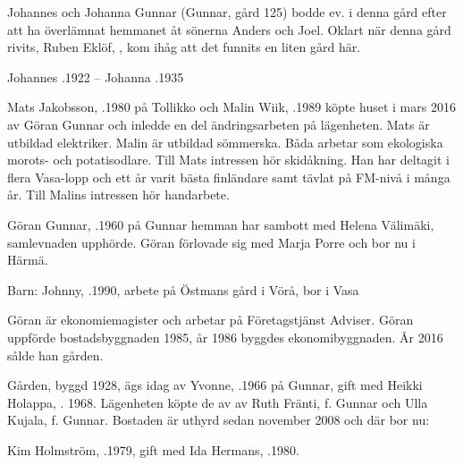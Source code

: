 
Johannes och Johanna Gunnar (Gunnar, gård 125) bodde ev. i denna gård efter att ha överlämnat hemmanet åt sönerna Anders och Joel. Oklart när denna gård rivits, Ruben Eklöf, , kom ihåg att det funnits en liten gård här.

Johannes .1922  --  Johanna .1935




Mats Jakobsson, .1980 på Tollikko och Malin Wiik, .1989 köpte huset i mars 2016 av Göran Gunnar och inledde en del ändringsarbeten på lägenheten. Mats är utbildad elektriker. Malin är utbildad sömmerska. Båda arbetar som ekologiska morots- och potatisodlare.
Till Mats intressen hör skidåkning. Han har deltagit i flera Vasa-lopp och ett år varit bästa finländare samt tävlat på FM-nivå i många år. Till Malins intressen hör handarbete.

Göran Gunnar, .1960 på Gunnar hemman har sambott med Helena Välimäki, samlevnaden upphörde. Göran förlovade sig med Marja Porre och bor nu i Härmä.

Barn: Johnny, .1990, arbete på Östmans gård i Vörå, bor i Vasa

Göran är ekonomiemagister och arbetar på Företagstjänst Adviser. Göran uppförde bostadsbyggnaden 1985, år 1986 byggdes  	ekonomibyggnaden. År 2016 sålde han gården.




Gården, byggd 1928, ägs idag av Yvonne, .1966 på Gunnar, gift med Heikki Holappa, . 1968. Lägenheten köpte de av av Ruth Fränti, f. Gunnar och Ulla Kujala, f. Gunnar. Bostaden är uthyrd sedan november 2008 och där bor nu:

Kim Holmström, .1979, gift med Ida Hermans, .1980.
\begin{jhchildren}
  \item {}
  \item {}
  \item {}
\end{jhchildren}



